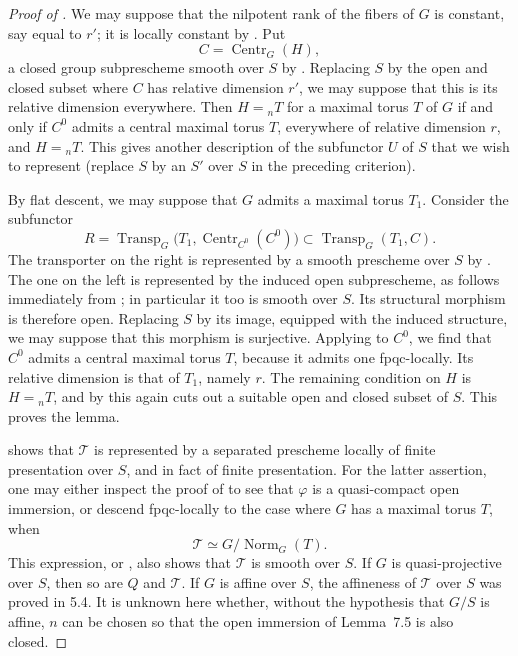 \begin{proof}[Proof of ]
We may suppose that the nilpotent rank of the fibers of \(G\) is
constant, say equal to \(r'\); it is locally constant by
\textup{}. Put
\[
  C=\operatorname{Centr}_G(H),
\]
a closed group subprescheme smooth over \(S\) by . Replacing
\(S\) by the open and closed subset where \(C\) has relative
dimension \(r'\), we may suppose that this is its relative dimension
everywhere. Then \(H={}_nT\) for a maximal torus \(T\) of \(G\) if
and only if \(C^0\) admits a central maximal torus \(T\), everywhere
of relative dimension \(r\), and \(H={}_nT\). This gives another
description of the subfunctor \(U\) of \(S\) that we wish to represent
(replace \(S\) by an \(S'\) over \(S\) in the preceding criterion).

By flat descent, we may suppose that \(G\) admits a maximal torus
\(T_1\). Consider the subfunctor
\[
  R=
  \operatorname{Transp}_G
  \bigl(T_1,\operatorname{Centr}_{C^0}(C^0)\bigr)
  \subset
  \operatorname{Transp}_G(T_1,C).
\]
The transporter on the right is represented by a smooth prescheme
over \(S\) by . The one on the left is represented by the
induced open subprescheme, as follows immediately from ;
in particular it too is smooth over \(S\). Its structural morphism
is therefore open. Replacing \(S\) by its image, equipped with the
induced structure, we may suppose that this morphism is surjective.
Applying  to \(C^0\), we find that \(C^0\) admits a central
maximal torus \(T\), because it admits one fpqc-locally. Its relative
dimension is that of \(T_1\), namely \(r\). The remaining condition
on \(H\) is \(H={}_nT\), and by  this again cuts out a suitable
open and closed subset of \(S\). This proves the lemma.

 shows that \(\mathcal T\) is represented by a separated
prescheme locally of finite presentation over \(S\), and in fact of
finite presentation. For the latter assertion, one may either
inspect the proof of  to see that \(\varphi\) is a
quasi-compact open immersion, or descend fpqc-locally to the case
where \(G\) has a maximal torus \(T\), when
\[
  \mathcal T\simeq G/\operatorname{Norm}_G(T).
\]
This expression, or , also shows that \(\mathcal T\) is smooth
over \(S\). If \(G\) is quasi-projective over \(S\), then so are
\(Q\) and \(\mathcal T\). If \(G\) is affine over \(S\), the
affineness of \(\mathcal T\) over \(S\) was proved in 5.4. It is
unknown here whether, without the hypothesis that \(G/S\) is
affine, \(n\) can be chosen so that the open immersion of Lemma~7.5
is also closed.


\end{proof}
